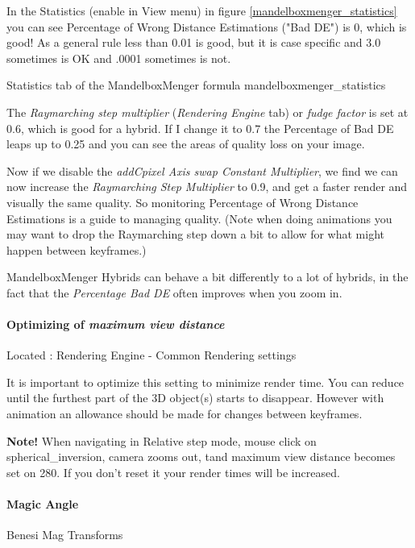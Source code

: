 In the Statistics (enable in View menu) in figure \ref{mandelboxmenger_statistics} you can see Percentage of Wrong Distance
Estimations ("Bad DE") is 0, which is good! As a general rule less than 0.01
is good, but it is case specific and 3.0 sometimes is OK and .0001 sometimes is
not.

{Statistics tab of the MandelboxMenger formula}
{mandelboxmenger_statistics}

The \emph{Raymarching step multiplier} (\emph{Rendering Engine} tab) or
\emph{fudge factor} is set at 0.6, which is good for a hybrid. If I change it to
0.7 the Percentage of Bad DE leaps up to 0.25 and you can see the areas of
quality loss on your image.

Now if we disable the \emph{addCpixel Axis swap Constant Multiplier}, we find we
can now increase the \emph{Raymarching Step Multiplier} to 0.9, and get a faster
render and visually the same quality. So monitoring Percentage of Wrong Distance
Estimations is a guide to managing quality. (Note when doing animations you may
want to drop the Raymarching step down a bit to allow for what might happen
between keyframes.)

MandelboxMenger Hybrids can behave a bit differently to a lot of hybrids, in the
fact that the \emph{Percentage Bad DE} often improves when you zoom in.

\paragraph{Optimizing of \emph{maximum view distance}} Located : Rendering
Engine - Common Rendering settings

It is important to optimize this setting to minimize render time. You can reduce
until the furthest part of the 3D object(s) starts to disappear. However with
animation an allowance should be made for changes between keyframes.

\textbf{Note!} When navigating in Relative step mode, mouse click on
spherical\_inversion, camera zooms out, tand maximum view distance becomes set
on 280. If you don't reset it your render times will be increased.
	

\paragraph{Magic Angle} Benesi Mag Transforms

